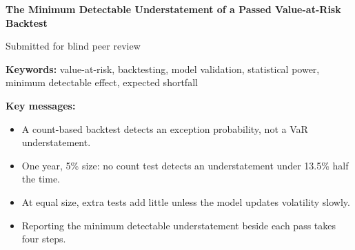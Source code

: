 \documentclass[11pt]{article}
\begin{document}
\begin{center}
{\LARGE\bfseries The Minimum Detectable Understatement of a Passed
Value-at-Risk Backtest\par}
\vspace{8pt}
{\normalsize Submitted for blind peer review\par}
\end{center}
\vspace{4pt}

\begin{abstract}
\noindent
A value-at-risk (VaR) backtest reports pass or fail. Under independent
exceptions, a count-based panel has an exact, distribution-free minimum
detectable exception probability. The minimum detectable
understatement (MDU) of VaR follows from it through the tail quantile. The
paper tabulates the MDU of the proportion-of-failures (POF), Christoffersen and
traffic-light tests over 250 to 1,000 days at 99\% and 97.5\% coverage. Under a
strict pass rule any rejection fails a model. Under a lenient rule only too
many exceptions do. Take 250 days at 99\% and a Gaussian tail. No test of 5\%
size that reads only the exceptions detects an understatement below 13.5\% of
VaR half the time, or below 19.7\% with probability 80\%. The standard panel
nearly attains both limits. Student-$t$ tails with five degrees
of freedom raise them to 21\% and 29\%. A wrong tail makes correct models fail
far more often, while estimation error in a correct model changes the figures
little. Extra tests, including an e-backtest of expected shortfall tied to VaR,
add little unless the model updates volatility slowly. After the fact, a pass
excludes even less, but only through hindsight. The power
calculation is classical; the contribution is its tabulated inverse.
\end{abstract}

\vspace{4pt}
\noindent\textbf{Keywords:} value-at-risk, backtesting, model validation,
statistical power, minimum detectable effect, expected shortfall

\vspace{6pt}
\noindent\textbf{Key messages:}
\begin{itemize}\setlength{\itemsep}{2pt}
\item A count-based backtest detects an exception probability, not a VaR understatement.
\item One year, 5\% size: no count test detects an understatement under 13.5\% half the time.
\item At equal size, extra tests add little unless the model updates volatility slowly.
\item Reporting the minimum detectable understatement beside each pass takes four steps.
\end{itemize}
\vspace{6pt}
\end{document}
